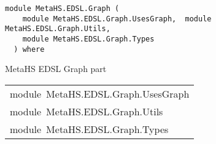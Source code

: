 \label{module:MetaHS.EDSL.Graph}
\haddockbeginheader
{\haddockverb\begin{verbatim}
module MetaHS.EDSL.Graph (
    module MetaHS.EDSL.Graph.UsesGraph,  module MetaHS.EDSL.Graph.Utils, 
    module MetaHS.EDSL.Graph.Types
  ) where\end{verbatim}}
\haddockendheader

MetaHS EDSL Graph part\par

\begin{haddockdesc}
\item[\begin{tabular}{@{}l}
module\ MetaHS.EDSL.Graph.UsesGraph\\module\ MetaHS.EDSL.Graph.Utils\\module\ MetaHS.EDSL.Graph.Types
\end{tabular}]
\end{haddockdesc}